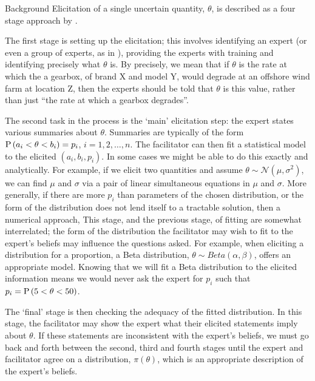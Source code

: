 \begin{chapter}{Background \label{Ch:background}}
Elicitation of a single uncertain quantity, $\theta$, is described as a four stage approach by \citet{Garthwaite05}.

The first stage is setting up the elicitation; this involves identifying an expert (or even a group of experts, as in \citet{Williams2021}), providing the experts with training and identifying precisely what $\theta$ is. By precisely, we mean that if $\theta$ is the rate at which the a gearbox, of brand X and model Y, would degrade at an offshore wind farm at location Z, then the experts should be told that $\theta$ is this value, rather than just ``the rate at which a gearbox degrades''.

The second task in the process is the `main' elicitation step: the expert states various summaries about $\theta$. Summaries are typically of the form $\mathrm{P}\, (a_i < \theta < b_i) = p_i$, $i = 1, 2, \ldots, n$. The facilitator can then fit a statistical model to the elicited $(a_i, b_i, p_i)$. In some cases we might be able to do this exactly and analytically. For example, if we elicit two quantities and assume $\theta \sim \mathcal{N}(\mu, \sigma^2)$, we can find $\mu$ and $\sigma$ via a pair of linear simultaneous equations in $\mu$ and $\sigma$. More generally, if there are more $p_i$ than parameters of the chosen distribution, or the form of the distribution does not lend itself to a tractable solution, then a numerical approach,  This stage, and the previous stage, of fitting are somewhat interrelated; the form of the distribution the facilitator may wish to fit to the expert's beliefs may influence the questions asked. For example, when eliciting a distribution for a proportion, a Beta distribution, $\theta \sim Beta(\alpha, \beta)$, offers an appropriate model. Knowing that we will fit a Beta distribution to the elicited information means we would never ask the expert for $p_i$ such that $p_i = \mathrm{P}\, (5 < \theta < 50)$.

The `final' stage is then checking the adequacy of the fitted distribution. In this stage, the facilitator may show the expert what their elicited statements imply about $\theta$. If these statements are inconsistent with the expert's beliefs, we must go back and forth between the second, third and fourth stages until the expert and facilitator agree on a distribution, $\pi(\theta)$, which is an appropriate description of the expert's beliefs.


\end{chapter}
